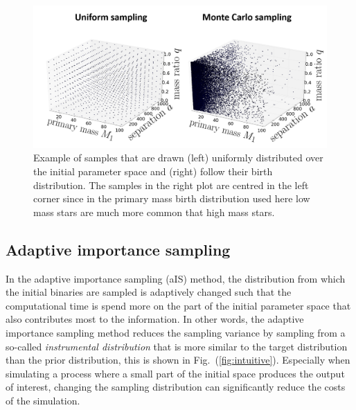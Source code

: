 \documentclass[a4paper,fleqn,usenatbib]{mnras}
\begin{document}
\begin{figure}
	\includegraphics[width=\columnwidth]{sampling_methods.png}
    \caption{Example of   samples that are drawn (left)  uniformly distributed over the initial parameter space and (right) follow their birth distribution. The samples in the right plot are centred in the left corner since in the primary mass birth distribution used here low mass stars are much more common that high mass stars. }
    \label{fig:sampling_methods}
\end{figure}



\subsection{Adaptive importance sampling}
\label{subsec:aIS}
In the adaptive importance sampling (aIS) method, the  distribution from which the initial binaries are sampled is adaptively changed such that the computational time is spend more on the part of the initial parameter space that also contributes most to the information.
In other words, the adaptive importance sampling method reduces the sampling variance by sampling from a so-called \emph{instrumental distribution} that is more similar to the target distribution than the prior distribution,  this is shown in Fig.~(\ref{fig:intuitive}). Especially when simulating a process where a small part of the initial space produces the output of interest, changing the sampling distribution can significantly reduce the costs of the simulation. 

\end{document}
